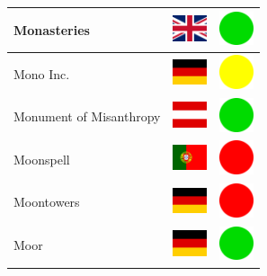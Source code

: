 \documentclass[12pt, a4paper, twoside]{report}
\begin{document}
\begin{center}
\begin{longtable}{|p{5cm}|p{2cm}|p{2cm}|}
 Monasteries                                                & \includegraphics[width=1cm]{../img/flags/gb} &   \includegraphics[width=1cm]{../likes/y} \\ \hline
 Mono Inc.                                                  & \includegraphics[width=1cm]{../img/flags/de} &   \includegraphics[width=1cm]{../likes/m} \\ \hline
 Monument of Misanthropy                                    & \includegraphics[width=1cm]{../img/flags/at} &   \includegraphics[width=1cm]{../likes/y} \\ \hline
 Moonspell                                                  & \includegraphics[width=1cm]{../img/flags/pt} &   \includegraphics[width=1cm]{../likes/n} \\ \hline
 Moontowers                                                 & \includegraphics[width=1cm]{../img/flags/de} &   \includegraphics[width=1cm]{../likes/n} \\ \hline
 Moor                                                       & \includegraphics[width=1cm]{../img/flags/de} &   \includegraphics[width=1cm]{../likes/y} \\ \hline

\end{longtable}
\end{center}
\end{document}
